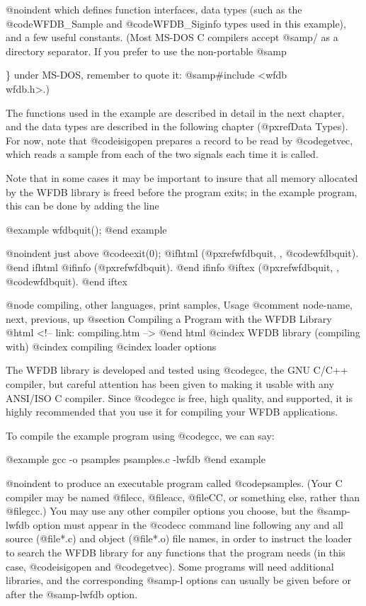 @noindent
which defines function interfaces, data types (such as the
@code{WFDB_Sample} and @code{WFDB_Siginfo} types used in this example), and
a few useful constants.  (Most MS-DOS C compilers accept @samp{/} as a
directory separator.  If you prefer to use the non-portable @samp{\}
under MS-DOS, remember to quote it: @samp{#include <wfdb\\wfdb.h>}.)

The functions used in the example are described in detail in the next
chapter, and the data types are described in the following chapter
(@pxref{Data Types}).  For now, note that @code{isigopen} prepares a
record to be read by @code{getvec}, which reads a sample from each of
the two signals each time it is called.  

Note that in some cases it may be important to insure that all memory
allocated by the WFDB library is freed before the program exits;  in
the example program, this can be done by adding the line

@example
wfdbquit();
@end example

@noindent
just above @code{exit(0);}
@ifhtml
(@pxref{wfdbquit, , @code{wfdbquit}}).
@end ifhtml
@ifinfo
(@pxref{wfdbquit}).
@end ifinfo
@iftex
(@pxref{wfdbquit, , @code{wfdbquit}}).
@end iftex

@node     compiling, other languages, print samples, Usage
@comment  node-name,  next,  previous,  up
@section Compiling a Program with the WFDB Library
@html
<!-- link: compiling.htm -->
@end html
@cindex WFDB library (compiling with)
@cindex compiling
@cindex loader options

The WFDB library is developed and tested using @code{gcc}, the GNU C/C++
compiler, but careful attention has been given to making it usable with any
ANSI/ISO C compiler.  Since @code{gcc} is free, high quality, and supported, it
is highly recommended that you use it for compiling your WFDB applications.

To compile the example program using @code{gcc}, we can say:

@example
gcc -o psamples psamples.c -lwfdb
@end example

@noindent
to produce an executable program called @code{psamples}.  (Your C
compiler may be named @file{cc}, @file{acc}, @file{CC}, or something
else, rather than @file{gcc}.)  You may use any other compiler
options you choose, but the @samp{-lwfdb} option must appear in the
@code{cc} command line following any and all source (@file{*.c}) and
object (@file{*.o}) file names, in order to instruct the loader to
search the WFDB library for any functions that the program needs (in
this case, @code{isigopen} and @code{getvec}).  Some programs will need
additional libraries, and the corresponding @samp{-l} options can
usually be given before or after the @samp{-lwfdb} option.

}
